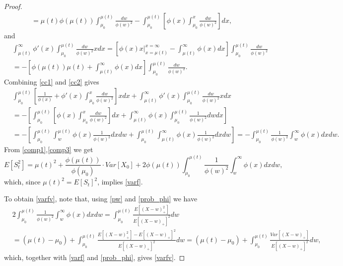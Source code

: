\documentclass{article}
\numberwithin{equation}{section}
\begin{document}
\begin{proof}
\begin{align}
		&=\mu(t)\phi(\mu(t))\int_{\mu_0}^{\mu(t)}\frac{dw}{\phi(w)^2} -\int_{\mu_0}^{\mu(t)}\left[\phi(x)\int_{\mu_0}^{x}\frac{dw}{\phi(w)^2}\right]dx,\nonumber
	\end{align}
	and
	\begin{align}\label{cc2}
		&\int_{\mu(t)}^\infty 	\phi'(x)\int_{\mu_0}^{\mu(t)}\frac{dw}{\phi(w)^2} xdx=\left[\phi(x)x\Big|_{x=\mu(t)}^{x=\infty}-\int_{\mu(t)}^\infty \phi(x)dx\right]
		\int_{\mu_0}^{\mu(t)}\frac{dw}{\phi(w)^2}\nonumber\\&=-\left[\phi(\mu(t))\mu(t)+\int_{\mu(t)}^\infty \phi(x)dx\right]
		\int_{\mu_0}^{\mu(t)}\frac{dw}{\phi(w)^2}.
	\end{align}
	Combining \eqref{cc1} and \eqref{cc2} gives
	\begin{align}\label{comp3}
		&\int_{\mu_0}^{\mu(t)}\left[\frac{1}{\phi(x)}+ \phi'(x)\int_{\mu_0}^{x}\frac{dw}{\phi(w)^2}\right]xdx+\int_{\mu(t)}^\infty 	\phi'(x)\int_{\mu_0}^{\mu(t)}\frac{dw}{\phi(w)^2} xdx \\
		&=-\left[   \int_{\mu_0}^{\mu(t)}\left[\phi(x)\int_{\mu_0}^{x}\frac{dw}{\phi(w)^2}\right]dx+
		\int_{\mu(t)}^\infty\phi(x)\int_{\mu_0}^{\mu(t)}\frac{1}{\phi(w)^2} dwdx \right]\nonumber\\
		&=-\left[  \int_{\mu_0}^{\mu(t)}\int_{w}^{\mu(t)}\phi(x)\frac{1}{\phi(w)^2}dx dw+ 
		\int_{\mu_0}^{\mu(t)}\int_{\mu(t)}^\infty\phi(x)\frac{1}{\phi(w)^2} dx dw \right] =-
		\int_{\mu_0}^{\mu(t)}\frac{1}{\phi(w)^2} \int_{w}^\infty \phi(x) dx dw. \nonumber
	\end{align}
	From \eqref{comp1},\eqref{comp3} we get
	$$E[S_t^2]=\mu(t)^2+\frac{\phi(\mu(t))}{\phi(\mu_0)}\cdot Var[X_0]+2\phi(\mu(t)) 
	\int_{\mu_0}^{\mu(t)}\frac{1}{\phi(w)^2} \int_{w}^\infty \phi(x) dx dw,$$
	which, since $\mu(t)^2=E[S_t]^2$, implies \eqref{varf}.
	
	To obtain \eqref{varfv}, note that, using \eqref{pw} and \eqref{prob_phi} we have
	\begin{align}\label{idk}
		&2
		\int_{\mu_0}^{\mu(t)}\frac{1}{\phi(w)^2} \int_{w}^\infty \phi(x) dx dw=\int_{\mu_0}^{\mu(t)}\frac{E[(X-w)_+^2]}{E[(X-w)_+]^2}  dw\\&=(\mu(t)-\mu_0)+\int_{\mu_0}^{\mu(t)}\frac{E[(X-w)_+^2]-E[(X-w)_+]^2}{E[(X-w)_+]^2}  dw
		=(\mu(t)-\mu_0)+\int_{\mu_0}^{\mu(t)}\frac{Var[(X-w)_+]}{E[(X-w)_+]^2}  dw,\nonumber
	\end{align}
	which, together with \eqref{varf} and \eqref{prob_phi}, gives \eqref{varfv}.
	
\end{proof}
\end{document}
